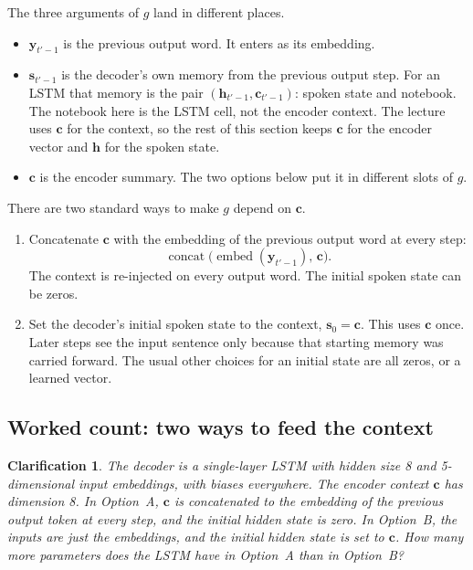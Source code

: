 \documentclass[11pt]{article}
\newtheorem*{clarification}{Clarification}
\begin{document}
The three arguments of \(g\) land in different places.
\begin{itemize}[leftmargin=*]
  \item \(\mathbf{y}_{t'-1}\) is the previous output word. It enters as its
        embedding.
  \item \(\mathbf{s}_{t'-1}\) is the decoder's own memory from the previous
        output step. For an LSTM that memory is the pair
        \((\mathbf{h}_{t'-1},\mathbf{c}_{t'-1})\): spoken state and
        notebook. The notebook here is the LSTM cell, not the encoder
        context. The lecture uses \(\mathbf{c}\) for the context, so the
        rest of this section keeps \(\mathbf{c}\) for the encoder vector
        and \(\mathbf{h}\) for the spoken state.
  \item \(\mathbf{c}\) is the encoder summary. The two options below put it
        in different slots of \(g\).
\end{itemize}

There are two standard ways to make \(g\) depend on \(\mathbf{c}\).
\begin{enumerate}[leftmargin=*]
  \item Concatenate \(\mathbf{c}\) with the embedding of the previous
        output word at every step:
        \[
          \operatorname{concat}\bigl(
            \operatorname{embed}(\mathbf{y}_{t'-1}),\,\mathbf{c}
          \bigr).
        \]
        The context is re-injected on every output word. The initial spoken
        state can be zeros.
  \item Set the decoder's initial spoken state to the context,
        \(\mathbf{s}_0=\mathbf{c}\). This uses \(\mathbf{c}\) once. Later
        steps see the input sentence only because that starting memory was
        carried forward. The usual other choices for an initial state are
        all zeros, or a learned vector.
\end{enumerate}

\subsection{Worked count: two ways to feed the context}

\begin{clarification}
The decoder is a single-layer LSTM with hidden size 8 and 5-dimensional
input embeddings, with biases everywhere. The encoder context \(\mathbf{c}\)
has dimension 8. In Option~A, \(\mathbf{c}\) is concatenated to the
embedding of the previous output token at every step, and the initial
hidden state is zero. In Option~B, the inputs are just the embeddings, and
the initial hidden state is set to \(\mathbf{c}\). How many more parameters
does the LSTM have in Option~A than in Option~B?
\end{clarification}
\end{document}
